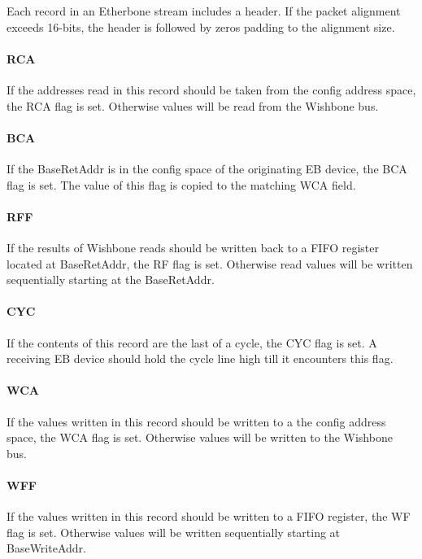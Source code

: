 \documentclass{article}
\begin{document}
Each record in an Etherbone stream includes a header.
If the packet alignment exceeds 16-bits, 
the header is followed by zeros padding to the alignment size.

\paragraph{RCA} \label{field:RCA}
If the addresses read in this record should be taken from the config
address space, the RCA flag is set.
Otherwise values will be read from the Wishbone bus.

\paragraph{BCA} \label{field:BCA}
If the BaseRetAddr is in the config space of the originating EB device,
the BCA flag is set.
The value of this flag is copied to the matching WCA field.

\paragraph{RFF} \label{field:RFF}
If the results of Wishbone reads should be written back to a FIFO register
located at BaseRetAddr, the RF flag is set.
Otherwise read values will be written sequentially starting at the
BaseRetAddr.

\paragraph{CYC} \label{field:CYC}
If the contents of this record are the last of a cycle,
the CYC flag is set.
A receiving EB device should hold the cycle line high till it encounters this flag.

\paragraph{WCA} \label{field:WCA}
If the values written in this record should be written to a the config
address space, the WCA flag is set.
Otherwise values will be written to the Wishbone bus.

\paragraph{WFF} \label{field:WFF}
If the values written in this record should be written to a FIFO register,
the WF flag is set.
Otherwise values will be written sequentially starting at BaseWriteAddr.
\end{document}
